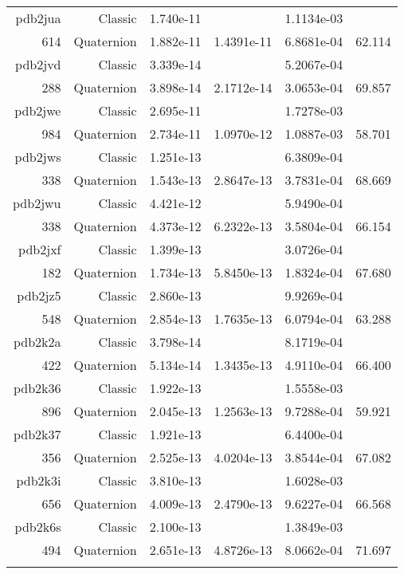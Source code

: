 \begin{xltabular}{\textwidth}{r|rS[table-format=1.3e+2]S[table-format=1.4e+2]S[table-format=1.4e+2]S[table-format=-1.3]}
pdb2jua & Classic & 1.740e-11 &  & 1.1134e-03 & \\
614 & Quaternion & 1.882e-11 & 1.4391e-11 & 6.8681e-04 & 62.114\\  \addlinespace
pdb2jvd & Classic & 3.339e-14 &  & 5.2067e-04 & \\
288 & Quaternion & 3.898e-14 & 2.1712e-14 & 3.0653e-04 & 69.857\\  \addlinespace
pdb2jwe & Classic & 2.695e-11 &  & 1.7278e-03 & \\
984 & Quaternion & 2.734e-11 & 1.0970e-12 & 1.0887e-03 & 58.701\\  \addlinespace
pdb2jws & Classic & 1.251e-13 &  & 6.3809e-04 & \\
338 & Quaternion & 1.543e-13 & 2.8647e-13 & 3.7831e-04 & 68.669\\  \addlinespace
pdb2jwu & Classic & 4.421e-12 &  & 5.9490e-04 & \\
338 & Quaternion & 4.373e-12 & 6.2322e-13 & 3.5804e-04 & 66.154\\  \addlinespace
pdb2jxf & Classic & 1.399e-13 &  & 3.0726e-04 & \\
182 & Quaternion & 1.734e-13 & 5.8450e-13 & 1.8324e-04 & 67.680\\  \addlinespace
pdb2jz5 & Classic & 2.860e-13 &  & 9.9269e-04 & \\
548 & Quaternion & 2.854e-13 & 1.7635e-13 & 6.0794e-04 & 63.288\\  \addlinespace
pdb2k2a & Classic & 3.798e-14 &  & 8.1719e-04 & \\
422 & Quaternion & 5.134e-14 & 1.3435e-13 & 4.9110e-04 & 66.400\\  \addlinespace
pdb2k36 & Classic & 1.922e-13 &  & 1.5558e-03 & \\
896 & Quaternion & 2.045e-13 & 1.2563e-13 & 9.7288e-04 & 59.921\\  \addlinespace
pdb2k37 & Classic & 1.921e-13 &  & 6.4400e-04 & \\
356 & Quaternion & 2.525e-13 & 4.0204e-13 & 3.8544e-04 & 67.082\\  \addlinespace
pdb2k3i & Classic & 3.810e-13 &  & 1.6028e-03 & \\
656 & Quaternion & 4.009e-13 & 2.4790e-13 & 9.6227e-04 & 66.568\\  \addlinespace
pdb2k6s & Classic & 2.100e-13 &  & 1.3849e-03 & \\
494 & Quaternion & 2.651e-13 & 4.8726e-13 & 8.0662e-04 & 71.697\\  \addlinespace

\end{xltabular}
